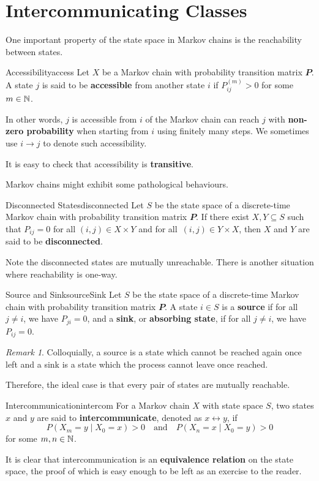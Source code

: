 \documentclass[math, code]{amznotes}
\theoremstyle{remark}
\newtheorem*{remark}{Remark}
\begin{document}
\section{Intercommunicating Classes}
One important property of the state space in Markov chains is the reachability between states.
\begin{dfnbox}{Accessibility}{access}
    Let $X$ be a Markov chain with probability transition matrix $\mathbfit{P}$. A state $j$ is said to be {\color{red} \textbf{accessible}} from another state $i$ if $P^{\left(m\right)}_{ij} > 0$ for some $m \in \mathbb{N}$.
\end{dfnbox}
In other words, $j$ is accessible from $i$ of the Markov chain can reach $j$ with \textbf{non-zero probability} when starting from $i$ using finitely many steps. We sometimes use $i \to j$ to denote such accessibility.

It is easy to check that accessibility is \textbf{transitive}.

Markov chains might exhibit some pathological behaviours.
\begin{dfnbox}{Disconnected States}{disconnected}
    Let $S$ be the state space of a discrete-time Markov chain with probability transition matrix $\mathbfit{P}$. If there exist $X, Y \subseteq S$ such that $P_{ij} = 0$ for all $\left(i, j\right) \in X \times Y$ and for all~$\left(i, j\right) \in Y \times X$, then $X$ and $Y$ are said to be {\color{red} \textbf{disconnected}}. 
\end{dfnbox}
Note the disconnected states are mutually unreachable. There is another situation where reachability is one-way.
\begin{dfnbox}{Source and Sink}{sourceSink}
    Let $S$ be the state space of a discrete-time Markov chain with probability transition matrix $\mathbfit{P}$. A state $i \in S$ is a {\color{red} \textbf{source}} if for all $j \neq i$, we have $P_{ji} = 0$, and a {\color{red} \textbf{sink}}, or {\color{red} \textbf{absorbing state}}, if for all $j \neq i$, we have $P_{ij} = 0$.
\end{dfnbox}
\begin{notebox}
    \begin{remark}
        Colloquially, a source is a state which cannot be reached again once left and a sink is a state which the process cannot leave once reached.
    \end{remark}
\end{notebox}
Therefore, the ideal case is that every pair of states are mutually reachable.
\begin{dfnbox}{Intercommunication}{intercom}
    For a Markov chain $X$ with state space $S$, two states $x$ and $y$ are said to {\color{red} \textbf{intercommunicate}}, denoted as $x \leftrightarrow y$, if 
    \begin{equation*}
        P\left(X_m = y \mid X_0 = x\right) > 0 \quad\textrm{and}\quad P\left(X_n = x \mid X_0 = y\right) > 0
    \end{equation*}
    for some $m, n \in \mathbb{N}$.
\end{dfnbox}
It is clear that intercommunication is an \textbf{equivalence relation} on the state space, the proof of which is easy enough to be left as an exercise to the reader. 
\end{document}
